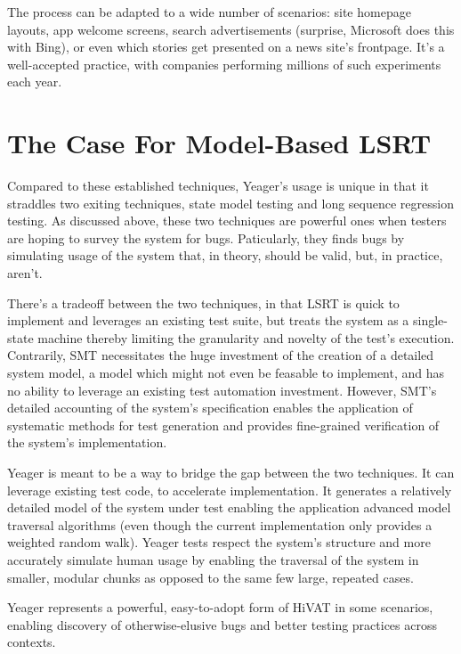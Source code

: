 The process can be adapted to a wide number of scenarios: site homepage layouts, app welcome screens, search advertisements (surprise, Microsoft does this with Bing), or even which stories get presented on a news site's frontpage. It's a well-accepted practice, with companies performing millions of such experiments each year. \citep{HBR2017ABTest}

\section{The Case For Model-Based LSRT}
Compared to these established techniques, Yeager's usage is unique in that it straddles two exiting techniques, state model testing and long sequence regression testing. As discussed above, these two techniques are powerful ones when testers are hoping to survey the system for bugs. Paticularly, they finds bugs by simulating usage of the system that, in theory, should be valid, but, in practice, aren't.

There's a tradeoff between the two techniques, in that LSRT is quick to implement and leverages an existing test suite, but treats the system as a single-state machine thereby limiting the granularity and novelty of the test's execution. Contrarily, SMT necessitates the huge investment of the creation of a detailed system model, a model which might not even be feasable to implement, and has no ability to leverage an existing test automation investment. However, SMT's detailed accounting of the system's specification enables the application of systematic methods for test generation and provides fine-grained verification of the system's implementation.

Yeager is meant to be a way to bridge the gap between the two techniques. It can leverage existing test code, to accelerate implementation. It generates a relatively detailed model of the system under test enabling the application advanced model traversal algorithms (even though the current implementation only provides a weighted random walk). Yeager tests respect the system's structure and more accurately simulate human usage by enabling the traversal of the system in smaller, modular chunks as opposed to the same few large, repeated cases.

Yeager represents a powerful, easy-to-adopt form of HiVAT in some scenarios, enabling discovery of otherwise-elusive bugs and better testing practices across contexts.
